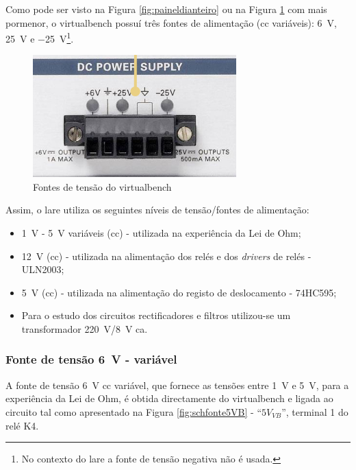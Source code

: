 Como pode ser visto na Figura \ref{fig:paineldianteiro} ou na Figura \ref{fig:promenorfontes} com mais pormenor, o \acrshort{virtualbench} possuí três fontes de alimentação (\acrshort{cc} variáveis): \SI{+6}{\volt}, \SI{+25}{\volt} e \SI{-25}{\volt}\footnote{No contexto do \acrshort{lare} a fonte de tensão negativa não é usada.}.

\begin{figure}[hbtp]
	\centering
	\includegraphics[width=0.7\textwidth]{figures/fontes_VB.png}
	\caption{Fontes de tensão do \acrshort{virtualbench}}
	\label{fig:promenorfontes}
\end{figure}

Assim, o \acrshort{lare} utiliza os seguintes níveis de tensão/fontes de alimentação:
\begin{itemize}
	\item \SI{1}{\volt} - \SI{5}{\volt} variáveis (\acrshort{cc}) - utilizada na experiência da Lei de Ohm;
	\item \SI{12}{\volt} (\acrshort{cc}) - utilizada na alimentação dos relés e dos \textit{drivers} de relés - ULN2003;
	\item \SI{5}{\volt} (\acrshort{cc}) - utilizada na alimentação do registo de deslocamento - 74HC595;
	\item Para o estudo dos circuitos rectificadores e filtros utilizou-se um transformador \SI{220}{\volt}/\SI{8}{\volt} \acrshort{ca}.
\end{itemize}

\subsubsection{Fonte de tensão \SI{6}{\volt} - variável}
A fonte de tensão \SI{+6}{\volt} \acrshort{cc} variável, que fornece as tensões entre \SI{1}{\volt} e \SI{5}{\volt}, para a experiência da Lei de Ohm, é obtida directamente do \acrshort{virtualbench} e ligada ao circuito tal como apresentado na Figura \ref{fig:schfonte5VB} - ``$5V_{VB}$'', terminal 1 do relé K4.

